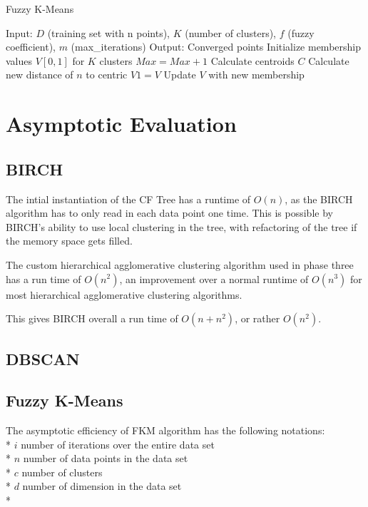 \documentclass[conference, 10pt]{IEEEtran}
\begin{document}
  \begin{algorithm}
  \caption{Fuzzy K-Means}
  \begin{algorithmic}[1]
  \State Input: $D$ (training set with n points), $K$ (number of clusters), $f$ (fuzzy coefficient), $m$ (max\_iterations)
  \State Output: Converged points
    \State Initialize membership values $V[0,1]$ for $K$ clusters
    \State $Max=Max+1$
          \State Calculate centroids $C$
          \State Calculate new distance of $n$ to centric
          \State $V1 = V$
          \State Update $V$ with new membership
      \EndFor
    \EndFor
  \EndProcedure
  \Statex
  \end{algorithmic}
  \end{algorithm}


  \section{Asymptotic Evaluation}

  \subsection{BIRCH}
  The intial instantiation of the CF Tree has a runtime of $O(n)$, as the BIRCH algorithm has to only read in each data point one time. This is possible by BIRCH's ability to use local clustering in the tree, with refactoring of the tree if the memory space gets filled.

  The custom hierarchical agglomerative clustering algorithm used in phase three has a run time of $O(n^2)$, an improvement over a normal runtime of $O(n^3)$ for most hierarchical agglomerative clustering algorithms.

  This gives BIRCH overall a run time of $O(n+n^2)$, or rather $O(n^2)$.
  \subsection{DBSCAN}


  \subsection{Fuzzy K-Means}
  The asymptotic efficiency of FKM algorithm has the following notations:\\*
  $i$ number of iterations over the entire data set\\*
  $n$ number of data points in the data set\\*
  $c$ number of clusters\\*
  $d$ number of dimension in the data set\\*
\end{document}
